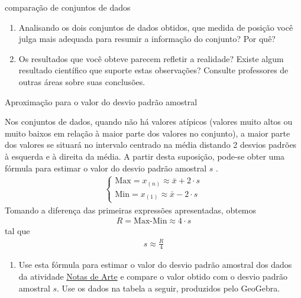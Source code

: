 {{{\begin{task}{ comparação de conjuntos de dados}
\begin{enumerate}
\item {} 
Analisando os dois conjuntos de dados obtidos, que medida de posição você julga mais adequada para resumir a informação do conjunto? Por quê?

\item Os resultados que você obteve parecem refletir a realidade? Existe algum resultado científico que suporte estas observações? Consulte professores de outras áreas sobre suas conclusões.

\end{enumerate}
\end{task}

\begin{task}{Aproximação para o valor do desvio padrão amostral}
\label{\detokenize{PE104-5:ativ-aproxima-dpa-usando-r}}

Nos conjuntos de dados, quando não há valores atípicos (valores muito altos ou muito baixos em relação à maior parte dos valores no conjunto), a maior parte dos valores se situará no intervalo centrado na média distando 2 desvios padrões à esquerda e à direita da média. A partir desta suposição, pode-se obter uma fórmula para estimar o valor do desvio padrão amostral \(s\) .
\begin{equation*}
\begin{split}\left \{ \begin{array}{l} \text{Max}=x_{(n)}\approx \bar{x}+2\cdot s \\ \text{Min}=x_{(1)}\approx \bar{x}-2\cdot s\end{array}\right.\end{split}
\end{equation*}
Tomando a diferença das primeiras expressões apresentadas, obtemos
\begin{equation*}
\begin{split}R= \text{Max-Min} \approx 4\cdot s\end{split}
\end{equation*}
tal que
\begin{equation*}
\begin{split}s\approx \frac{R}{4}\end{split}
\end{equation*}\begin{enumerate}
\item {} 
Use esta fórmula para estimar o valor do desvio padrão amostral dos dados da atividade \hyperref[\detokenize{PE104-0:ativ-notas-de-artes}]{Notas de Arte} e compare o valor obtido com o desvio padrão amostral \(s\). Use os dados na tabela a seguir, produzidos pelo GeoGebra.


\end{enumerate}
\end{task}}}}
